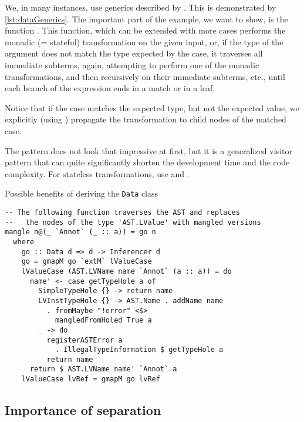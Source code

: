 We, in many instances, use generics described by \citet{lammel2003scrap}. This is demonstrated by \cref{lst:dataGenerics}. The important part of the example, we want to show, is the function . This function, which can be extended with more  cases performs the monadic (= stateful) transformation  on the given input, or, if the type of the argument does not match the type expected by the case, it traverses all immediate subterms, again, attempting to perform one of the monadic transformations, and then recursively on their immediate subterms, etc., until each branch of the expression ends in a match or in a leaf.

Notice that if the case matches the expected type, but not the expected value, we explicitly (using ) propagate the transformation to child nodes of the matched case.

The  pattern does not look that impressive at first, but it is a generalized visitor pattern that can quite significantly shorten the development time and the code complexity. For stateless transformations, use  and .

\begin{listing}
    \caption{Possible benefits of deriving the \texttt{Data} class}
    \label{lst:dataGenerics}
    \begin{lstlisting}[style=haskellStyle]
-- The following function traverses the AST and replaces
--   the nodes of the type 'AST.LValue' with mangled versions
mangle n@(_ `Annot` (_ :: a)) = go n
  where
    go :: Data d => d -> Inferencer d
    go = gmapM go `extM` lValueCase
    lValueCase (AST.LVName name `Annot` (a :: a)) = do
      name' <- case getTypeHole a of
        SimpleTypeHole {} -> return name
        LVInstTypeHole {} -> AST.Name . addName name
          . fromMaybe "!error" <$>
            mangledFromHoled True a
        _ -> do
          registerASTError a
            . IllegalTypeInformation $ getTypeHole a
          return name
      return $ AST.LVName name' `Annot` a
    lValueCase lvRef = gmapM go lvRef
    \end{lstlisting}

\end{listing}

\subsection{Importance of separation}

